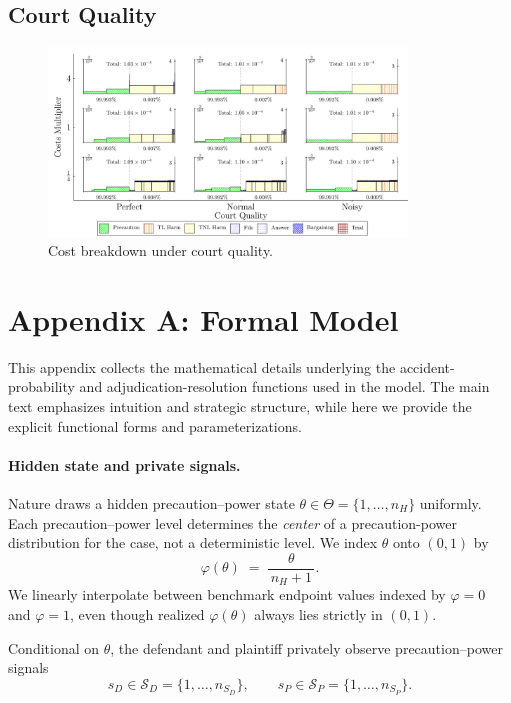 \documentclass{article}
\begin{document}
\subsection{Court Quality}
\begin{figure}[ht]
  \centering
  \includegraphics[width=0.85\textwidth]{../Figures/Cost Breakdown Court Quality (All Rows).pdf}
  \caption{Cost breakdown under court quality.}
  \label{fig:court_quality}
\end{figure}


\section*{Appendix A: Formal Model}

This appendix collects the mathematical details underlying the accident-probability and adjudication-resolution functions used in the model. The main text emphasizes intuition and strategic structure, while here we provide the explicit functional forms and parameterizations. 
\paragraph{Hidden state and private signals.}
Nature draws a hidden precaution–power state $\theta\in\Theta=\{1,\dots,n_H\}$ uniformly. Each precaution–power level determines the \emph{center} of a precaution-power distribution for the case, not a deterministic level. We index $\theta$ onto $(0,1)$ by
\[
\varphi(\theta)\;=\;\frac{\theta}{\,n_H+1\,}.
\]
We linearly interpolate between benchmark endpoint values indexed by $\varphi=0$ and $\varphi=1$, even though realized $\varphi(\theta)$ always lies strictly in $(0,1)$.

Conditional on $\theta$, the defendant and plaintiff privately observe precaution–power signals
\[
s_D\in\mathcal{S}_D=\{1,\dots,n_{S_D}\},\qquad
s_P\in\mathcal{S}_P=\{1,\dots,n_{S_P}\}.
\]
\end{document}
